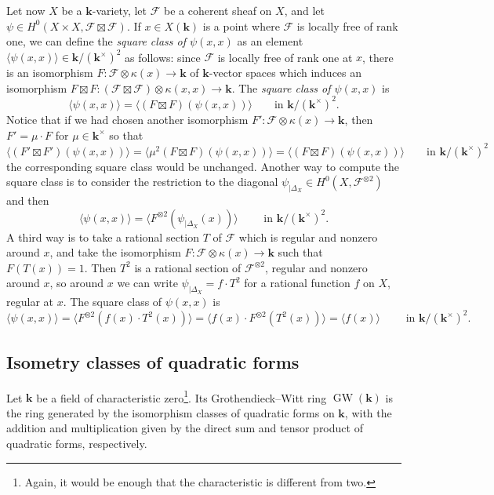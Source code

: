 \documentclass[12pt]{amsart}
\numberwithin{equation}{section}
\numberwithin{thmcounter}{section}
\theoremstyle{definition}
\theoremstyle{claim}
\newcommand{\kk}{\mathbf{k}}
\newcommand{\sF}{\mathscr{F}}
\DeclareMathOperator{\GW}{GW}
\begin{document}
Let now $X$ be a $\kk$-variety, let $\sF$ be a coherent sheaf on $X$, and let $\psi \in H^0(X\times X,\sF\boxtimes \sF)$.
 If $x\in X(\kk)$ is a point where $\sF$ is locally free of rank one, we can define the \emph{square class of $\psi(x,x)$} as an element $\langle \psi(x,x) \rangle \in \kk/(\kk^{\times})^2$ as follows:  since $\sF$ is locally free of rank one at $x$, there is an isomorphism $F\colon \sF\otimes \kappa(x) \to \kk$ of $\kk$-vector spaces which induces an isomorphism $F\boxtimes F\colon (\sF\boxtimes \sF)\otimes \kappa(x,x) \to \kk$. The \emph{square class of $\psi(x,x)$} is
 \[ \langle \psi(x,x) \rangle =  \langle (F\boxtimes F)(\psi(x,x)) \rangle \qquad \text{in } \kk/(\kk^\times)^2 .\]
Notice that if we had chosen another isomorphism $F'\colon \sF\otimes \kappa(x) \to \kk$, then $F'=\mu\cdot F$ for $\mu\in \kk^{\times}$ so that
\[ \langle (F'\boxtimes F')(\psi(x,x)) \rangle = \langle \mu^2(F\boxtimes F)(\psi(x,x)) \rangle  = \langle (F\boxtimes F)(\psi(x,x)) \rangle \qquad \text{in } \kk/(\kk^\times)^2 \]
the corresponding square class would be unchanged. Another way to compute the square class is to consider the restriction to the diagonal $\psi_{|\Delta_X} \in H^0(X,\sF^{\otimes 2})$ and then
\[ \langle \psi(x,x) \rangle = \langle F^{\otimes 2}(\psi_{|\Delta_X}(x)) \rangle \qquad \text{ in } \kk/(\kk^{\times})^2. \]
A third way is to take a rational section $T$ of $\sF$ which is regular and nonzero around $x$, and take the isomorphism $F\colon \sF \otimes \kappa(x) \to \kk$ such that $F(T(x))=1$.
Then $T^2$ is a rational section of $\sF^{\otimes 2}$, regular and nonzero around $x$, so around $x$ we can write $\psi_{|\Delta_X} = f\cdot T^2$ for a rational function $f$ on $X$, regular at $x$. The square class of $\psi(x,x)$ is
\[ \langle \psi(x,x) \rangle = \langle F^{\otimes 2}(f(x)\cdot T^2(x)) \rangle = \langle f(x)\cdot F^{\otimes 2}( T^2(x)) \rangle  = \langle f(x)\rangle \qquad \text{ in } \kk/(\kk^{\times})^2. \]

\subsection{Isometry classes of quadratic forms}
Let $\kk$ be a field of characteristic zero\footnote{Again, it would be enough that the characteristic is different from two.}. Its Grothendieck--Witt ring $\GW(\kk)$ is the ring generated by the isomorphism classes of quadratic forms on $\kk$, with the addition and multiplication given by the direct sum and tensor product of quadratic forms, respectively.
\end{document}
